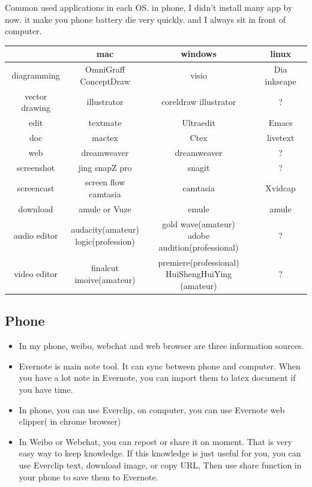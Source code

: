 \documentclass[paper=8.5in:11in, twoside, 12pt, pagesize=pdftex]{book}
\begin{document}
Common used applications in each OS. in phone, I didn't install many app by now. it make you phone battery die very quickly. and I always sit in front of computer. \\

\begin{tabular}{|c|c|c|c|}
\hline & mac & windows & linux  \\
\hline diagramming & \parbox[c]{10em}{\centering OmniGraff \\ ConceptDraw}& visio & Dia   inkscape \\
\hline vector drawing & illustrator & coreldraw illustrator & ? \\
\hline edit & textmate & Ultraedit & Emacs \\
\hline doc & mactex & Ctex & livetext \\
\hline web & dreamweaver & dreamweaver & ? \\
\hline screenshot & jing snapZ pro & snagit & ? \\
\hline screencast & \parbox[c]{10em}{\centering screen flow \\ camtasia }& camtasia & Xvidcap \\
\hline download & amule or Vuze & emule & amule  \\
\hline audio editor & \parbox[c]{10em}{\centering audacity(amateur) \\ logic(profession)} & \parbox[c]{10em}{\centering gold wave(amateur)\\ adobe audition(professional)} & ? \\
\hline video editor & \parbox[c]{10em}{\centering finalcut \\  imoive(amateur)} & \parbox[c]{10em}{\centering premiere(professional) \\HuiShengHuiYing (amateur)}& ? \\
\hline
\end{tabular}


\subsection{Phone}
\begin{itemize}
  \item In my phone, weibo, webchat and web browser are three information sources.
  
  \item Evernote is main note tool. It can sync between phone and computer. When you have a lot note in Evernote, you can import them to latex document if you have time.
  \item In phone, you can use Everclip, on computer, you can use Evernote web clipper( in chrome browser)
  \item In Weibo or Webchat, you can repost or share it on moment. That is very easy way to keep knowledge. If this knowledge is just useful for you, you can use Everclip text, download image, or copy URL, Then use share function in your phone to save them to Evernote.
\end{itemize}
\end{document}
